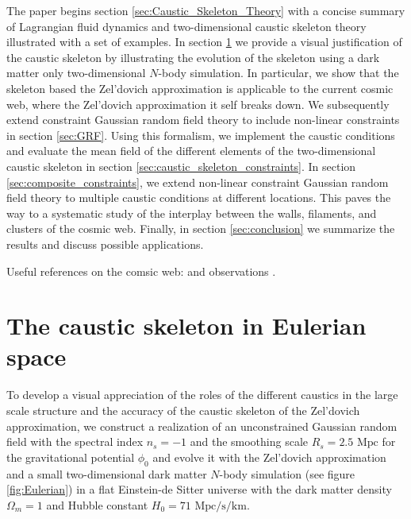 \documentclass[a4paper, 11pt]{article}
\begin{document}
The paper begins section \ref{sec:Caustic_Skeleton_Theory} with a concise summary of Lagrangian fluid dynamics and two-dimensional caustic skeleton theory illustrated with a set of examples. In section \ref{sec:Eulerian_space} we provide a visual justification of the caustic skeleton by illustrating the evolution of the skeleton using a dark matter only two-dimensional $N$-body simulation. In particular, we show that the skeleton based the Zel'dovich approximation is applicable to the current cosmic web, where the Zel'dovich approximation it self breaks down. We subsequently extend constraint Gaussian random field theory to include non-linear constraints in section \ref{sec:GRF}. Using this formalism, we implement the caustic conditions and evaluate the mean field of the different elements of the two-dimensional caustic skeleton in section \ref{sec:caustic_skeleton_constraints}. In section \ref{sec:composite_constraints}, we extend non-linear constraint Gaussian random field theory to multiple caustic conditions at different locations. This paves the way to a systematic study of the interplay between the walls, filaments, and clusters of the cosmic web. Finally, in section \ref{sec:conclusion} we summarize the results and discuss possible applications.


\begin{framed}
Useful references on the comsic web: 
\cite{Peebles:1980, Bond:1996, Weygaert:2008, Aragon:2010a, Aragon:2010b, Jasche:2010, Kitaura:2013, Cautun:2014, Leclercq:2015, Leclercq:2017, Libeskind:2017} and observations
\cite{Colless:2003, Tegmark:2004, Huchra:2012, Guzzo:2014}.
\end{framed}





\section{The caustic skeleton in Eulerian space}\label{sec:Eulerian_space}
To develop a visual appreciation of the roles of the different caustics in the large scale structure and the accuracy of the caustic skeleton of the Zel'dovich approximation, we construct a realization of an unconstrained Gaussian random field with the spectral index $n_s=-1$ and the smoothing scale $R_s=2.5 \text{ Mpc}$ for the gravitational potential $\phi_0$ and evolve it with the Zel'dovich approximation and a small two-dimensional dark matter $N$-body simulation \cite{Hidding:2020} (see figure \ref{fig:Eulerian}) in a flat Einstein-de Sitter universe with the dark matter density $\Omega_m=1$ and Hubble constant $H_0=71\text{ Mpc/s/km}$. 
\end{document}
